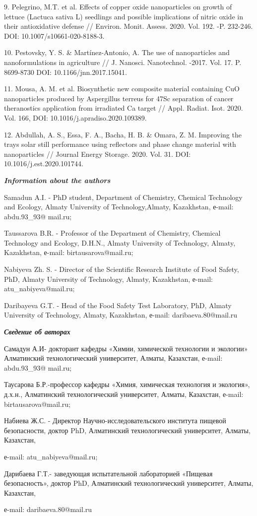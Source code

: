 \begin{noparindent}
9. Pelegrino, M.T. et al. Effects of copper oxide nanoparticles on growth
of lettuce (Lactuca sativa L) seedlings and possible implications of
nitric oxide in their antioxidative defense // Environ. Monit. Assess.
2020. Vol. 192. -P. 232-246. DOI: 10.1007/s10661-020-8188-3.

10. Pestovsky, Y. S. \& Martínez-Antonio, A. The use of nanoparticles and
nanoformulations in agriculture // J. Nanosci. Nanotechnol. -2017.
Vol. 17. P. 8699-8730 DOI: 10.1166/jnn.2017.15041.

11. Mousa, A. M. et al. Biosynthetic new composite material containing CuO
nanoparticles produced by Aspergillus terreus for 47Sc separation of
cancer theranostics application from irradiated Ca target // Appl.
Radiat. Isot. 2020. Vol. 166, DOI: 10.1016/j.apradiso.2020.109389.

12. Abdullah, A. S., Essa, F. A., Bacha, H. B. \& Omara, Z. M. Improving
the trays solar still performance using reflectors and phase change
material with nanoparticles // Journal Energy Storage. 2020. Vol. 31.
DOI: 10.1016/j.est.2020.101744.
\end{noparindent}

\emph{{\bfseries Information about the authors}}

\begin{noparindent}
Samadun A.I. - PhD student, Department of Chemistry, Chemical Technology
and Ecology, Almaty University of Technology,Almaty, Kazakhstan, е-mail:
abdu.93\_93@ mail.ru;

Taussarova B.R. - Professor of the Department of Chemistry, Chemical
Technology and Ecology, D.H.N., Almaty University of Technology, Almaty,
Kazakhstan, е-mail: birtausarova@mail.ru;

Nabiyeva Zh. S. - Director of the Scientific Research Institute of Food
Safety, PhD, Almaty University of Technology, Almaty, Kazakhstan,
е-mail: atu\_nabiyeva@mail.ru;

Daribayeva G.T. - Head of the Food Safety Test Laboratory, PhD, Almaty
University of Technology, Almaty, Kazakhstan, е-mail:
daribaeva.80@mail.ru
\end{noparindent}

\emph{{\bfseries Сведение об авторах}}

\begin{noparindent}
Самадун А.И- докторант кафедры «Химии, химической технологии и экологии»
Алматинский технологический университет, Алматы, Казахстан, е-mail:
abdu.93\_93@ mail.ru;

Таусарова Б.Р.-профессор кафедры «Химия, химическая технология и
экология», д.х.н., Алматинский технологический университет, Алматы,
Казахстан, е-mail: birtausarova@mail.ru;

Набиева Ж.С. - Директор Научно-исследовательского института пищевой
безопасности, доктор PhD, Алматинский технологический университет,
Алматы, Казахстан,

е-mail: atu\_nabiyeva@mail.ru;

Дарибаева Г.Т.- заведующая испытательной лабораторией «Пищевая
безопасность», доктор PhD, Алматинский технологический университет,
Алматы, Казахстан,

е-mail: daribaeva.80@mail.ru
\end{noparindent}

